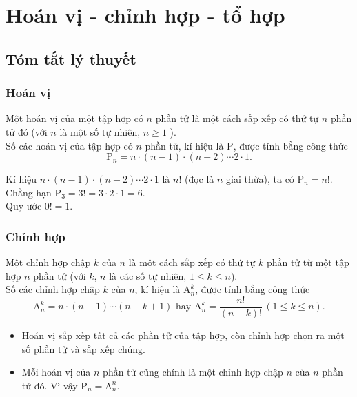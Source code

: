 \newpage \setcounter{dang}{0}
\section{Hoán vị - chỉnh hợp - tổ hợp}
\subsection{Tóm tắt lý thuyết}
\subsubsection{Hoán vị}
\begin{dn}{}
	Một hoán vị của một tập hợp có $n$ phần tử là một cách sắp xếp có thứ tự $n$ phần tử đó (với $n$ là một số tự nhiên, $n \geq 1$ ).\\
	Số các hoán vị của tập hợp có $n$ phần tử, kí hiệu là $\mathrm{P}$, được tính bằng công thức $$\mathrm{P}_{n}=n \cdot(n-1) \cdot(n-2) \cdots 2 \cdot 1.$$
\end{dn}

\begin{note}
	Kí hiệu $n \cdot(n-1) \cdot(n-2) \cdots 2 \cdot 1$ là $n!$ (đọc là $n$ giai thừa), ta có $\mathrm{P}_{n}=n!$. Chẳng hạn $\mathrm{P}_{3}=3!=3 \cdot 2 \cdot 1=6$.\\
	Quy ước $0 !=1$.
\end{note}

\subsubsection{Chỉnh hợp}
\begin{dn}{}
	Một chỉnh hợp chập $k$ của $n$ là một cách sắp xếp có thứ tự $k$ phần tử từ một tập hợp $n$ phần tử (với $k$, $n$ là các số tự nhiên, $1 \leq k \leq n$).\\
	Số các chỉnh hợp chập $k$ của $n$, kí hiệu là $\mathrm{A}_{n}^{k}$, được tính bằng công thức
	$$\mathrm{A}_{n}^{k}=n \cdot(n-1) \cdots(n-k+1) \text { hay } \mathrm{A}_{n}^{k}=\dfrac{n!}{(n-k)!}\,(1 \leq k \leq n).$$
\end{dn}

\begin{note}
	\begin{itemize}
		\item Hoán vị sắp xếp tất cả các phần tử của tập hợp, còn chỉnh hợp chọn ra một số phần tử và sắp xếp chúng.
		\item Mỗi hoán vị của $n$ phần tử cũng chính là một chỉnh hợp chập $n$ của $n$ phần tử đó. Vì vậy $\mathrm{P}_{n}=\mathrm{A}_{n}^{n}$.
	\end{itemize}
\end{note}

